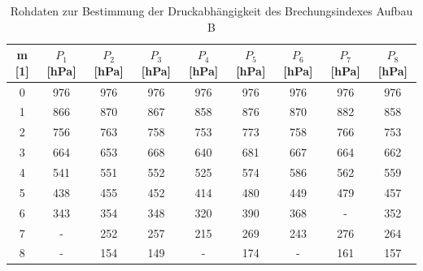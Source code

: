 \documentclass[12pt,a4paper]{article}
\begin{document}
\begin{table}
\begin{center}
\begin{tabular}{|c|c|c|c|c|c|c|c|c|}
\hline 
m [1] & $P_1$ [hPa] & $P_2$ [hPa] & $P_3$ [hPa] & $P_4$ [hPa] & $P_5$ [hPa] & $P_6$ [hPa] & $P_7$ [hPa] & $P_8$ [hPa] \\ 
\hline 
0 & 976 & 976 & 976 & 976 & 976 & 976 & 976 & 976 \\ 
\hline 
1 & 866 & 870 & 867 & 858 & 876 & 870 & 882 & 858 \\ 
\hline 
2 & 756 & 763 & 758 & 753 & 773 & 758 & 766 & 753 \\ 
\hline 
3 & 664 & 653 & 668 & 640 & 681 & 667 & 664 & 662 \\ 
\hline 
4 & 541 & 551 & 552 & 525 & 574 & 586 & 562 & 559 \\ 
\hline 
5 & 438 & 455 & 452 & 414 & 480 & 449 & 479 & 457 \\ 
\hline 
6 & 343 & 354 & 348 & 320 & 390 & 368 & - & 352 \\ 
\hline 
7 & - & 252 & 257 & 215 & 269 & 243 & 276 & 264 \\ 
\hline 
8 & - & 154 & 149 & - & 174 & - & 161 & 157 \\ 
\hline 
\end{tabular} 
\caption{Rohdaten zur Bestimmung der Druckabhängigkeit des Brechungsindexes Aufbau B}
\label{tab:Rohdaten_Druck_B}
\end{center}
\end{table}
\end{document}
